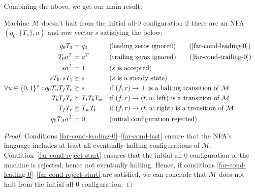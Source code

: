 Combining the above, we get our main result:

\begin{theorem}\normalfont
  \label{far-main-theorem}
  Machine $\mathcal{M}$ doesn't halt from the initial all-0 configuration if there are an NFA $(q_0, \{T_\gamma\}, a)$ and row vector $s$ satisfying the below:
  \begin{align}
    \label{far-cond-first}
    q_0 T_0                                & = q_0
                                           &                     & \text{(leading zeros ignored)}
    \tag{\ref{far-cond-leading-0}}
    \\
    T_0a\T                              & = a\T
                                           &                     & \text{(trailing zeros ignored)}
    \tag{\ref{far-cond-trailing-0}}
    \\
    sa\T                                   & = 1
                                           &                     & \text{($s$ is accepted)}
    \label{far-cond-ass-accepted}
    \\
    sT_0,sT_1                              & \succeq s
                                           &                     & \text{($s$ is a steady state)}
    \label{far-cond-ass-steady}
    \\
    \forall u\in\{0, 1\}^*: q_0T_u T_f T_r & \succeq s
                                           &                     & \text{if $(f,r) \to \bot$ is a halting transition of $\mathcal{M}$}
    \label{far-cond-halt}
    \\
    T_b T_f T_r                            & \succeq T_t T_b T_w
                                           &                     & \text{if $(f,r) \to (t,w,\text{left})$ is a transition of $\mathcal{M}$}
    \label{far-cond-left}
    \\
    T_f T_r                                & \succeq T_w T_t
                                           &                     & \text{if $(f,r) \to (t,w,\text{right})$ is a transition of $\mathcal{M}$}
    \label{far-cond-last}
    \\
    q_0 T_A a\T                            & = 0
                                           &                     & \text{(initial configuration rejected)}
    \label{far-cond-reject-start}
  \end{align}
\end{theorem}
\begin{proof}
  Conditions \eqref{far-cond-leading-0}--\eqref{far-cond-last} ensure that the NFA's language includes at least all eventually halting configurations of $\mathcal{M}$. Condition~\eqref{far-cond-reject-start} ensures that the initial all-0 configuration of the machine is rejected, hence not eventually halting. Hence, if conditions \eqref{far-cond-leading-0}--\eqref{far-cond-reject-start} are satisfied, we can conclude that $\mathcal{M}$ does not halt from the initial all-0 configuration.
\end{proof}


